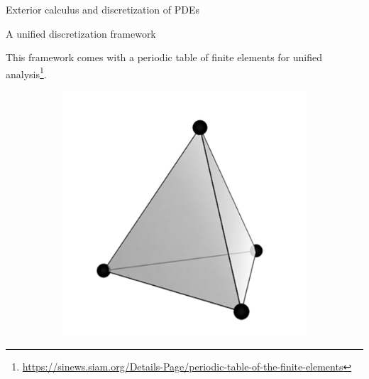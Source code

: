 \documentclass{beamer}
\begin{document}
\begin{frame}{Exterior calculus and discretization of PDEs}
	
	\begin{block}{A unified discretization framework}
	\end{block}
	
	This framework comes with a periodic table of finite elements for unified analysis\footnote{\url{https://sinews.siam.org/Details-Page/periodic-table-of-the-finite-elements}}.
	
	\begin{figure}[t]
		\begin{subfigure}[t]{0.23\textwidth}
			\includegraphics[width=\columnwidth]{P1_tetrahedron.pdf}%
		\end{subfigure}
		\begin{subfigure}[t]{0.23\textwidth}

\end{subfigure}
\end{figure}
\end{frame}
\end{document}
